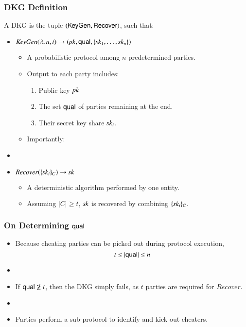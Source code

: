 \documentclass[hyperref={pdfpagelabels=true},table,dvipsnames,14pt,aspectratio=169]{beamer}
\begin{document}
\begin{frame}
  \frametitle{DKG Definition}

  A DKG is the tuple $(\mathsf{KeyGen}, \mathsf{Recover})$, such that:

  \begin{itemize}
    \item<2-> $\mathit{KeyGen}(\lambda, n, t) \rightarrow ( \mathit{pk}, \mathsf{qual}, \{\mathit{sk}_1, \ldots, \mathit{sk}_n \} )$
    \begin{itemize}
      \item<3-> A probabilistic protocol among $n$ predetermined parties.
      \item<4-> Output to each party includes:
    \begin{enumerate}
      \item<5->[1.] Public key $\mathit{pk}$
      \item<6->[2.] The set $\mathsf{qual}$ of parties remaining at the end.
      \item<7->[3.] Their secret key share $\mathit{sk}_i$.
    \end{enumerate}

    \item<8-> Importantly:

    \end{itemize}
    \item[]
    \item<8-> $\mathit{Recover}(\{ \mathit{sk}_i \}_C) \rightarrow \mathit{sk}$
    \begin{itemize}
      \item<9-> A deterministic algorithm performed by one entity.
      \item<10-> Assuming $\lvert C \rvert \geq t$, $\mathit{sk}$ is recovered by combining $\{ \mathit{sk}_i \}_C$.
    \end{itemize}
  \end{itemize}
\end{frame}

\begin{frame}
  \frametitle{On Determining $\mathsf{qual}$}

  \begin{itemize}
    \item<1-> Because cheating parties can be picked out during protocol execution,
      \[ t \leq \lvert \mathsf{qual} \rvert \leq n \]
    \item[]
    \item<2-> If $\mathsf{qual} \not\geq t$, then the DKG simply fails, as $t$ parties are required for $\mathit{Recover}$.
    \item[]
    \item<3-> Parties perform a sub-protocol to identify and kick out cheaters.
  \end{itemize}
\end{frame}
\end{document}

